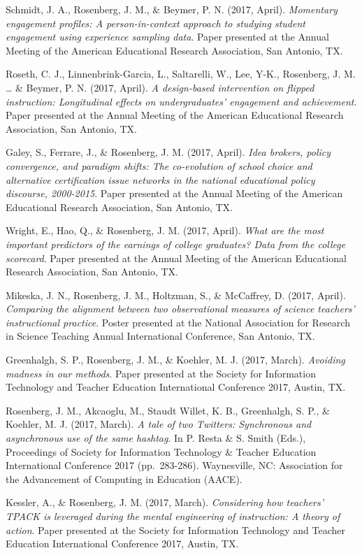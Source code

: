 \documentclass[14,]{article}
\begin{document}
Schmidt, J. A., Rosenberg, J. M., \& Beymer, P. N. (2017, April).
\emph{Momentary engagement profiles: A person-in-context approach to
studying student engagement using experience sampling data}. Paper
presented at the Annual Meeting of the American Educational Research
Association, San Antonio, TX.

Roseth, C. J., Linnenbrink-Garcia, L., Saltarelli, W., Lee, Y-K.,
Rosenberg, J. M. \ldots{} \& Beymer, P. N. (2017, April). \emph{A
design-based intervention on flipped instruction: Longitudinal effects
on undergraduates' engagement and achievement}. Paper presented at the
Annual Meeting of the American Educational Research Association, San
Antonio, TX.

Galey, S., Ferrare, J., \& Rosenberg, J. M. (2017, April). \emph{Idea
brokers, policy convergence, and paradigm shifts: The co-evolution of
school choice and alternative certification issue networks in the
national educational policy discourse, 2000-2015}. Paper presented at
the Annual Meeting of the American Educational Research Association, San
Antonio, TX.

Wright, E., Hao, Q., \& Rosenberg, J. M. (2017, April). \emph{What are
the most important predictors of the earnings of college graduates? Data
from the college scorecard}. Paper presented at the Annual Meeting of
the American Educational Research Association, San Antonio, TX.

Mikeska, J. N., Rosenberg, J. M., Holtzman, S., \& McCaffrey, D. (2017,
April). \emph{Comparing the alignment between two observational measures
of science teachers' instructional practice}. Poster presented at the
National Association for Research in Science Teaching Annual
International Conference, San Antonio, TX.

Greenhalgh, S. P., Rosenberg, J. M., \& Koehler, M. J. (2017, March).
\emph{Avoiding madness in our methods}. Paper presented at the Society
for Information Technology and Teacher Education International
Conference 2017, Austin, TX.

Rosenberg, J. M., Akcaoglu, M., Staudt Willet, K. B., Greenhalgh, S. P.,
\& Koehler, M. J. (2017, March). \emph{A tale of two Twitters:
Synchronous and asynchronous use of the same hashtag}. In P. Resta \& S.
Smith (Eds.), Proceedings of Society for Information Technology \&
Teacher Education International Conference 2017 (pp.~283-286).
Waynesville, NC: Association for the Advancement of Computing in
Education (AACE).

Kessler, A., \& Rosenberg, J. M. (2017, March). \emph{Considering how
teachers' TPACK is leveraged during the mental engineering of
instruction: A theory of action}. Paper presented at the Society for
Information Technology and Teacher Education International Conference
2017, Austin, TX.
\end{document}
